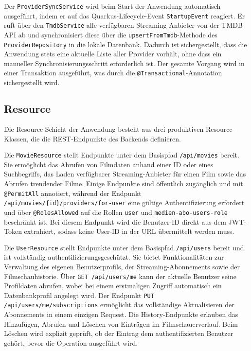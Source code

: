 Der \texttt{ProviderSyncService} wird beim Start der Anwendung automatisch
ausgeführt, indem er auf das Quarkus-Lifecycle-Event \texttt{StartupEvent}
reagiert. Er ruft über den \texttt{TmdbService} alle verfügbaren
Streaming-Anbieter von der TMDB API ab und synchronisiert diese über die
\texttt{upsertFromTmdb}-Methode des \texttt{ProviderRepository} in die
lokale Datenbank. Dadurch ist sichergestellt, dass die Anwendung stets eine
aktuelle Liste aller Provider vorhält, ohne dass ein manueller
Synchronisierungsschritt erforderlich ist. Der gesamte Vorgang wird in einer
Transaktion ausgeführt, was durch die \texttt{@Transactional}-Annotation
sichergestellt wird.

\subsection{Resource}

Die Resource-Schicht der Anwendung besteht aus drei produktiven
Resource-Klassen, die die REST-Endpunkte des Backends definieren.

Die \texttt{MovieResource} stellt Endpunkte unter dem Basispfad
\texttt{/api/movies} bereit. Sie ermöglicht das Abrufen von Filmdaten anhand
einer ID oder eines Suchbegriffs, das Laden verfügbarer Streaming-Anbieter
für einen Film sowie das Abrufen trendender Filme. Einige Endpunkte sind
öffentlich zugänglich und mit \texttt{@PermitAll} annotiert, während der
Endpunkt \texttt{/api/movies/\{id\}/providers/for-user} eine gültige
Authentifizierung erfordert und über \texttt{@RolesAllowed} auf die Rollen
\texttt{user} und \texttt{medien-abo-users-role} beschränkt ist. Bei diesem
Endpunkt wird die Benutzer-ID direkt aus dem JWT-Token extrahiert, sodass
keine User-ID in der URL übermittelt werden muss.

Die \texttt{UserResource} stellt Endpunkte unter dem Basispfad
\texttt{/api/users} bereit und ist vollständig authentifizierungsgeschützt.
Sie bietet Funktionalitäten zur Verwaltung des eigenen Benutzerprofils, der
Streaming-Abonnements sowie der Filmschauhistorie. Über
\texttt{GET /api/users/me} kann der aktuelle Benutzer seine Profildaten
abrufen, wobei bei einem erstmaligen Zugriff automatisch ein Datenbankprofil
angelegt wird. Der Endpunkt \texttt{PUT /api/users/me/subscriptions} ermöglicht das vollständige Aktualisieren der Abonnements in einem einzigen
Request. Die History-Endpunkte erlauben das Hinzufügen, Abrufen und Löschen
von Einträgen im Filmschauerverlauf. Beim Löschen wird explizit geprüft, ob
der Eintrag dem authentifizierten Benutzer gehört, bevor die Operation
ausgeführt wird.

